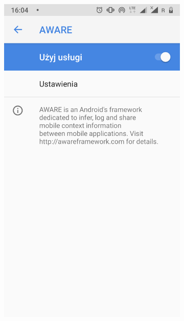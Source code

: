 \begin{enumerate}
	\begin{figure}[H]
		\centering
		\begin{subfigure}{0.35\textwidth}
			\centering
			\includegraphics[scale=0.13]{dodatekA/3_7.png}
			\subcaption{\label{subfigure_a}}
		\end{subfigure}
		\begin{subfigure}{0.35\textwidth}
			\centering

\end{subfigure}
\end{figure}
\end{enumerate}
